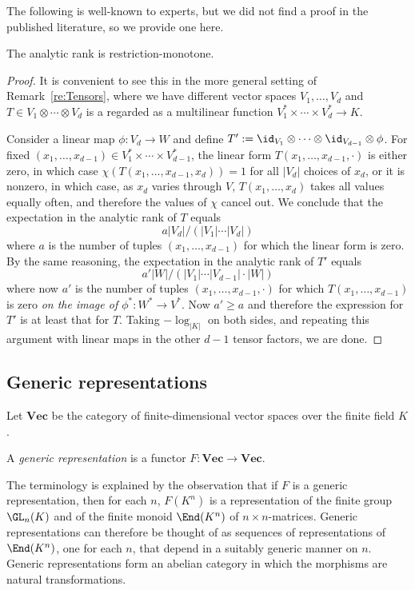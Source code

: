 \documentclass{amsart}
\renewcommand{\Vec}{\mathbf{Vec}}
\begin{document}
The following is well-known to experts, but we did not find a proof in
the published literature, so we provide one here.

\begin{lm} \label{lm:Analytic}
The analytic rank is restriction-monotone.
\end{lm}

\begin{proof}
It is convenient to see this in the more general setting of
Remark~\ref{re:Tensors}, where we have different vector spaces
$V_1,\ldots,V_d$ and $T \in V_1 \otimes \cdots \otimes V_d$ is a regarded
as a multilinear function $V_1^* \times \cdots \times V_d^* \to K$.

Consider a linear map $\phi:V_d \to W$ and define $T':=\id_{V_1} \otimes
\cdots \otimes \id_{V_{d-1}} \otimes \phi$. For fixed
$(x_1,\ldots,x_{d-1}) \in V_1^* \times \cdots \times
V_{d-1}^*$, the linear form $T(x_1,\ldots,x_{d-1},\cdot)$ is
either zero, in which case
$\chi(T(x_1,\ldots,x_{d-1},x_d))=1$ for all $|V_d|$ choices of $x_d$,
or it is nonzero, in which case, as $x_d$ varies through $V$,
$T(x_1,\ldots,x_d)$ takes all values equally often, and
therefore the values of $\chi$ cancel out. We conclude that the
expectation in the analytic rank of $T$ equals 
\[ a |V_d| / (|V_1| \cdots |V_d|) \]
where $a$ is the number of tuples $(x_1,\ldots,x_{d-1})$ for which
the linear form is zero. By the same reasoning, 
the expectation in the analytic rank of $T'$ equals
\[ a' |W|  / (|V_1| \cdots |V_{d-1}| \cdot |W|) \]
where now $a'$ is the number of tuples
$(x_1,\ldots,x_{d-1},\cdot)$ for
which $T(x_1,\ldots,x_{d-1})$ is zero {\em on the image of $\phi^*:W^*
\to V^*$}. Now $a' \geq a$ and therefore 
the expression for $T'$ is at least
that for $T$. Taking $-\log_{|K|}$ on both sides, and
repeating this argument with linear maps in the other $d-1$
tensor factors, we are done. 
\end{proof}

\subsection{Generic representations}

Let $\Vec$ be the category of finite-dimensional vector spaces over the
finite field $K$.

\begin{de}
A {\em generic representation} is a functor $F:\Vec \to \Vec$.  
\end{de}

The terminology is explained by the observation that if $F$ is a generic
representation, then for each $n$, $F(K^n)$ is a representation of the
finite group $\GL_n(K)$ and of the finite monoid $\End(K^n)$ of $n \times
n$-matrices. Generic representations can therefore be thought of as
sequences of representations of $\End(K^n)$, one for each $n$, that
depend in a suitably generic manner on $n$. Generic representations form
an abelian category in which the morphisms are natural transformations.
\end{document}
